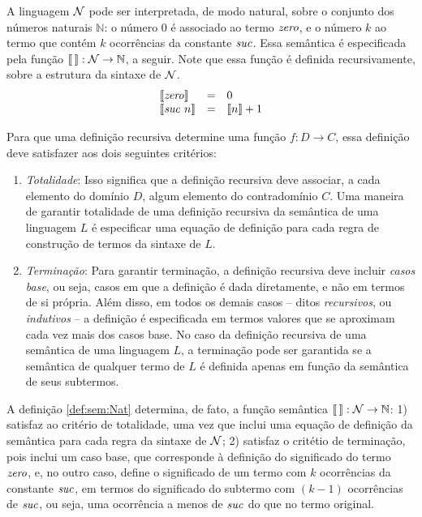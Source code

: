\begin{Definition}\label{def:sem:Nat}
A linguagem $\mathcal{N}$ pode ser interpretada, de modo natural, sobre o conjunto dos números naturais $\mathbb{N}$: o número $0$ é associado ao termo $\textit{zero\/}$, e o número $k$ ao termo que contém $k$ ocorr\^encias da constante $\textit{suc\/}$. Essa semântica é especificada pela função $\llbracket\,\rrbracket : \mathcal{N} \rightarrow \mathbb{N}$, a seguir. Note que essa função é definida recursivamente, sobre a estrutura da sintaxe de $\mathcal{N}$.
\[
\begin{array}{lcl}
\llbracket \textit{zero\/} \rrbracket & = & 0\\
\llbracket \textit{suc\/}\,\,n\rrbracket & = & \llbracket n \rrbracket + 1
\end{array}
\]
\end{Definition}
Para que uma definição recursiva determine uma função $f : D \rightarrow C$, essa definição deve satisfazer aos dois seguintes crit\'erios:
\begin{enumerate}

\item \emph{Totalidade\/}: Isso significa que a definição recursiva deve associar, a cada elemento do domínio $D$, algum elemento do contradomínio $C$.  Uma maneira de garantir totalidade de uma definição recursiva da semântica de uma linguagem $L$ é especificar uma equa\c{c}\~ao de definição para cada regra de construção de termos da sintaxe de $L$.


\item \emph{Terminação\/}: Para garantir terminação, a definição recursiva deve incluir \emph{casos base\/}, ou seja, casos em que a definição é dada diretamente, e não em termos de si própria. Além disso, em todos os demais casos -- ditos \emph{recursivos\/}, ou \emph{indutivos\/} --  a definição é especificada em termos valores que se aproximam cada vez mais dos casos base. No caso da definição recursiva de uma semântica de uma linguagem $L$, a terminação pode ser garantida se a semântica de qualquer termo de $L$ é definida apenas em função da semântica de seus subtermos.
\end{enumerate}

A definição \ref{def:sem:Nat} determina, de fato, a função semântica $\llbracket\,\rrbracket : \mathcal{N} \rightarrow \mathbb{N}$: 1) satisfaz ao critério de totalidade, uma vez que inclui uma equação de definição da semântica para cada regra da sintaxe de $\mathcal{N}$; 2) satisfaz o critétio de terminação, pois inclui um caso base, que corresponde à definição do significado do termo $\textit{zero\/}$, e, no outro caso, define o significado de um termo com $k$ ocorrências da constante $\textit{suc\/}$,  em termos do significado do subtermo com $(k-1)$ ocorrências de $\textit{suc\/}$, ou seja, uma ocorrência a menos de $\textit{suc\/}$ do que no termo original.

